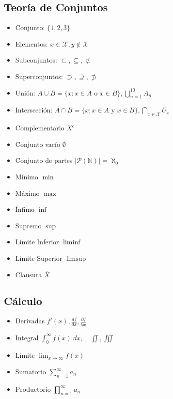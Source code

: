 \documentclass{article}
\begin{document}
\subsection{Teoría de Conjuntos}
\begin{itemize}
    \item Conjunto: $\{1,2,3\}$
    \item Elementos: $x \in \mathcal{X}, y\not\in \mathcal{X}$
    \item Subconjuntos: $\subset, \subseteq, \not\subset$
    \item Superconjuntos: $\supset, \supseteq, \not\supset$
    \item Unión: $A \cup B = \{x: x\in A \text{ o } x\in B\}, \displaystyle\bigcup_{n=1}^{10} A_n$
    \item Intersección: $A \cap B = \{x: x\in A \text{ y } x\in B\}, \displaystyle\bigcap_{x\in \mathcal{X}}U_x$
    \item Complementario $X^c$
    \item Conjunto vacío $\emptyset$
    \item Conjunto de partes $|\mathcal{P}(\mathbb N)| = \aleph_0$
    \item Mínimo $\min$
    \item Máximo $\max$
    \item Ínfimo $\inf$
    \item Supremo $\sup$
    \item Límite Inferior $\liminf$
    \item Límite Superior $\limsup$
    \item Clausura $\overline{X}$
\end{itemize}


\subsection{Cálculo}
\begin{itemize}
    \item Derivadas $f'(x), \displaystyle\frac{df}{dx}, \frac{\partial f}{\partial x}$
    \item Integral $\displaystyle\int_0^{\infty} f(x)\ dx,\quad \iint, \iiint$
    \item Límite $\displaystyle\lim_{x\to \infty} f(x)$
    \item Sumatorio $\displaystyle\sum_{n=1}^{\infty} a_n$
    \item Productorio $\displaystyle\prod_{n=1}^{\infty} a_n$
\end{itemize}
\end{document}
